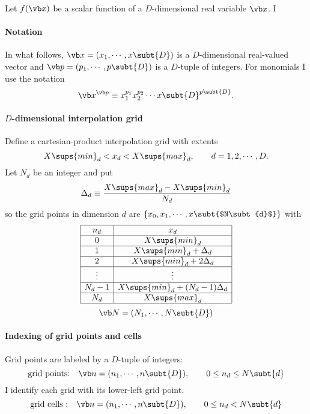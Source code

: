 \documentclass{article}
\begin{document}
Let $f(\vb x)$ be a scalar function of a $D$-dimensional
real variable $\vb x$. I 

\paragraph{Notation} In what follows, $\vb x=(x_1,\cdots,x\subt{D})$
is a $D$-dimensional real-valued vector and $\vb p=(p_1,\cdots,p\subt{D})$
is a $D$-tuple of integers. For monomials I use the notation
$$ \vb x^{\vb p} \equiv x_1^{p_1} x_2^{p_2} \cdots x\subt{D}^{p\subt{D}}. $$

\paragraph{$D$-dimensional interpolation grid}
Define a cartesian-product interpolation grid
with extents
$$X\sups{min}_d < x_d < X\sups{max}_d, \qquad d=1,2,\cdots,D.$$
Let $N_d$ be an integer and put
$$\Delta_d \equiv \frac{X\sups{max}_d - X\sups{min}_d}{N_d}$$
so the grid points in dimension $d$ are
$\{x_0,x_1,\cdots,x\subt{$N\subt{d}$}\}$ with
\renewcommand{\arraystretch}{1.5}
$$\begin{array}{|c|c|}\hline
  n_d & x_d                        \\\hline
  0   & X\sups{min}_d              \\\hline
  1   & X\sups{min}_d + \Delta_d   \\\hline 
  2   & X\sups{min}_d + 2\Delta_d  \\\hline
  \vdots & \vdots                  \\\hline
  N_d-1  & X\sups{min}_d + (N_d-1)\Delta_d  \\\hline
  N_d    & X\sups{max}_d \\\hline
  \end{array}
$$
\renewcommand{\arraystretch}{1.0}
$$\vb N=(N_1,\cdots,N\subt{D})$$

\paragraph{Indexing of grid points and cells}
Grid points are labeled by a $D$-tuple of integers:
$$\text{grid points:} \quad \vb n=(n_1,\cdots,n\subt{D}),
  \qquad 0 \le n_d \le N\subt{d}
$$
I identify each grid  with its lower-left grid point.
$$\text{grid cells :} \quad \vb n=(n_1,\cdots,n\subt{D}),
  \qquad 0 \le n_d < N\subt{d}
$$
\end{document}
